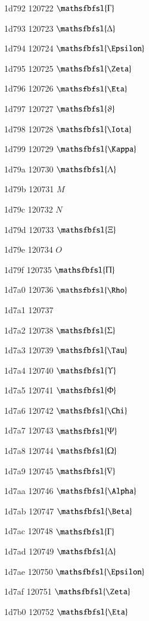 \documentclass[11pt]{article}
\begin{document}
1d792 120722 \ensuremath{\mathsfbfsl{\Gamma}}

1d793 120723 \ensuremath{\mathsfbfsl{\Delta}}

1d794 120724 \ensuremath{\mathsfbfsl{\Epsilon}}

1d795 120725 \ensuremath{\mathsfbfsl{\Zeta}}

1d796 120726 \ensuremath{\mathsfbfsl{\Eta}}

1d797 120727 \ensuremath{\mathsfbfsl{\vartheta}}

1d798 120728 \ensuremath{\mathsfbfsl{\Iota}}

1d799 120729 \ensuremath{\mathsfbfsl{\Kappa}}

1d79a 120730 \ensuremath{\mathsfbfsl{\Lambda}}

1d79b 120731 \ensuremath{M}

1d79c 120732 \ensuremath{N}

1d79d 120733 \ensuremath{\mathsfbfsl{\Xi}}

1d79e 120734 \ensuremath{O}

1d79f 120735 \ensuremath{\mathsfbfsl{\Pi}}

1d7a0 120736 \ensuremath{\mathsfbfsl{\Rho}}

1d7a1 120737 \mathsfbfsl{\vartheta}

1d7a2 120738 \ensuremath{\mathsfbfsl{\Sigma}}

1d7a3 120739 \ensuremath{\mathsfbfsl{\Tau}}

1d7a4 120740 \ensuremath{\mathsfbfsl{\Upsilon}}

1d7a5 120741 \ensuremath{\mathsfbfsl{\Phi}}

1d7a6 120742 \ensuremath{\mathsfbfsl{\Chi}}

1d7a7 120743 \ensuremath{\mathsfbfsl{\Psi}}

1d7a8 120744 \ensuremath{\mathsfbfsl{\Omega}}

1d7a9 120745 \ensuremath{\mathsfbfsl{\nabla}}

1d7aa 120746 \ensuremath{\mathsfbfsl{\Alpha}}

1d7ab 120747 \ensuremath{\mathsfbfsl{\Beta}}

1d7ac 120748 \ensuremath{\mathsfbfsl{\Gamma}}

1d7ad 120749 \ensuremath{\mathsfbfsl{\Delta}}

1d7ae 120750 \ensuremath{\mathsfbfsl{\Epsilon}}

1d7af 120751 \ensuremath{\mathsfbfsl{\Zeta}}

1d7b0 120752 \ensuremath{\mathsfbfsl{\Eta}}
\end{document}

